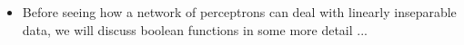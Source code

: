 \begin{frame}
	\begin{itemize}\justifying
		\item<1-> Before seeing how a network of perceptrons can deal with linearly inseparable data, we will discuss boolean functions in some more detail ...
	\end{itemize}
\end{frame}
